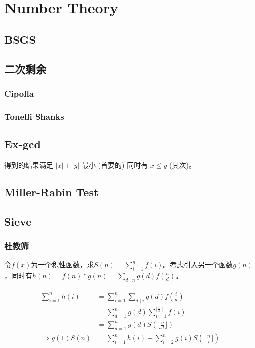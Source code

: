 \chapter{Number Theory}
\section{BSGS}

\section{二次剩余}
\subsection{Cipolla}
\subsection{Tonelli Shanks}

\section{Ex-gcd}
得到的结果满足 $|x|+|y|$ 最小 (首要的) 同时有 $x ≤ y$ (其次)。

\section{Miller-Rabin Test}

\section{Sieve}
\subsection{杜教筛}
令$f(x)$为一个积性函数，求$S(n)=\sum_{i=1}^{n}f(i)$。考虑引入另一个函数$g(n)$，同时有$h(n)=f(n)*g(n)=\sum_{d \mid n}g(d)f(\frac{n}{d})$。

\[
  \begin{aligned}
    \sum_{i=1}^{n}{h(i)}
    & = \sum_{i=1}^{n}\sum_{d \mid i}{g(d)f(\frac{i}{d})} \\
    & = \sum_{d=1}^{n}{g(d)}\sum_{i=1}^{\lfloor \frac{n}{d} \rfloor}{f(i)} \\
    & = \sum_{d=1}^{n}{g(d)S(\lfloor \frac{n}{d} \rfloor)} \\
    \Rightarrow 
    g(1)S(n) 
    & = \sum_{i=1}^{n}{h(i)}-\sum_{i=2}^{n}{g(i)S(\lfloor \frac{n}{i} \rfloor)}
  \end{aligned}
\]

